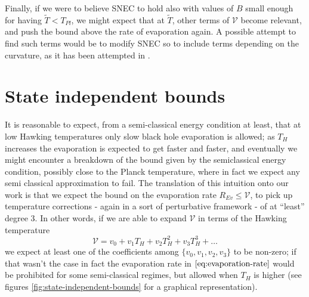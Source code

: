 Finally, if we were to believe SNEC to hold also with values of \(B\) small enough for having \(\tilde{T} < T_{Pl}\), we might expect that at \(\tilde{T}\), other terms of \(\mathcal{V}\) become relevant, and push the bound above the rate of evaporation again.
A possible attempt to find such terms would be to modify SNEC so to include terms depending on the curvature, as it has been attempted in \cite{kontou2015quantum}.

\section{State independent bounds}
\label{subsec:state-independent-bounds}
It is reasonable to expect, from a semi-classical energy condition at least, that at low Hawking temperatures only slow black hole evaporation is allowed; as \(T_H\) increases the evaporation is expected to get faster and faster, and eventually we might encounter a breakdown of the bound given by the semiclassical energy condition, possibly close to the Planck temperature, where in fact we expect any semi classical approximation to fail.
\noindent
The translation of this intuition onto our work is that we expect the bound on the evaporation rate \(R_{Ev} \le \mathcal{V}\), to pick up temperature corrections - again in a sort of perturbative framework - of at ``least'' degree \(3\).
In other words, if we are able to expand \(\mathcal{V}\) in terms of the Hawking temperature
\[
\mathcal{V} = v_0 + v_1T_H + v_2T_H^2 + v_3T_H^3 + \ldots	
\]
we expect at least one of the coefficients among \(\{v_0, v_1, v_2, v_3\}\) to be non-zero; if that wasn't the case in fact the evaporation rate in \(\eqref{eq:evaporation-rate}\) would be prohibited for some semi-classical regimes, but allowed when \(T_H\) is higher (see figures \ref{fig:state-independent-bounds} for a graphical representation).

